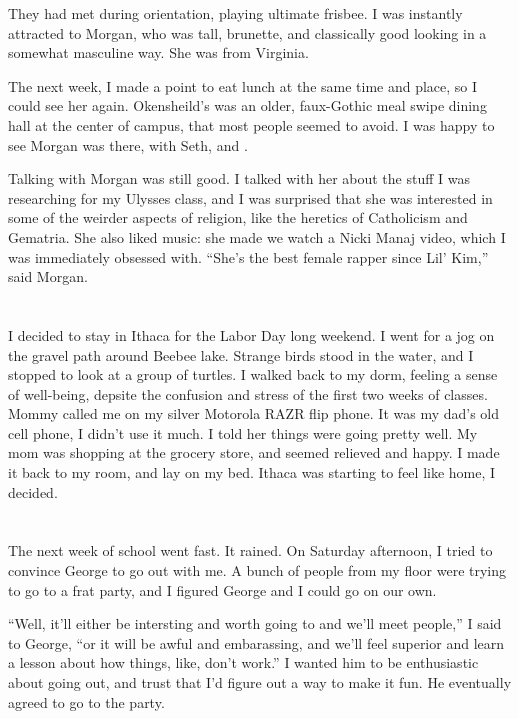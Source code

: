 They had met during orientation, playing ultimate frisbee.  I was instantly
attracted to Morgan, who was tall, brunette, and classically good looking in a
somewhat masculine way.  She was from Virginia. 

The next week, I made a point to eat lunch at the same time and place, so I
could see her again.  Okensheild's was an older, faux-Gothic meal swipe dining
hall at the center of campus, that most people seemed to avoid.   I was happy to
see Morgan was there, with Seth, and .

Talking with Morgan was still good.  I talked with her about the stuff I was
researching for my Ulysses class, and I was surprised that she was interested in
some of the weirder aspects of religion, like the heretics of Catholicism and
Gematria.  She also liked music: she made we watch a Nicki Manaj video, which I
was immediately obsessed with.  ``She's the best female rapper since Lil' Kim,''
said Morgan.

\section{}

I decided to stay in Ithaca for the Labor Day long weekend.  I went for a jog on
the gravel path around Beebee lake.  Strange birds stood in the water, and I
stopped to look at a group of turtles.  I walked back to my dorm, feeling a
sense of well-being, depsite the confusion and stress of the first two weeks of
classes.  Mommy called me on my silver Motorola RAZR flip phone.  It was my
dad's old cell phone, I didn't use it much.  I told her things were going pretty
well.  My mom was shopping at the grocery store, and seemed relieved and happy.
I made it back to my room, and lay on my bed.  Ithaca was starting to feel like
home, I decided.  

\section{}

The next week of school went fast.  It rained.  On Saturday afternoon, I tried
to convince George to go out with me.  A bunch of people from my floor were
trying to go to a frat party, and I figured George and I could go on our own.

``Well, it'll either be intersting and worth going to and we'll meet people,'' I
said to George, ``or it will be awful and embarassing, and we'll feel superior
and learn a lesson about how things, like, don't work.''  I wanted him to be
enthusiastic about going out, and trust that I'd figure out a way to make it
fun.  He eventually agreed to go to the party.  

